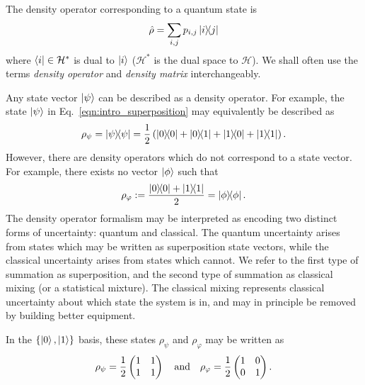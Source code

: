 
The density operator corresponding to a quantum state is
\begin{equation}
\hat{\rho} = \sum_{i, j} p_{i, j} \dyad{i}{j}
\end{equation}
where $\bra{i} \in \mathcal{H}^*$ is dual to $\ket{i}$ ($\mathcal{H}^*$ is the dual space to $\mathcal{H}$). %
We shall often use the terms \emph{density operator} and \emph{density matrix} interchangeably.

Any state vector $\ket{\psi}$ can be described as a density operator. For example, the state $\ket{\psi}$ in Eq.~\ref{eqn:intro_superposition} may equivalently be described as 
\begin{equation}
\rho_\psi = \dyad{\psi}{\psi} = \frac{1}{2} \left(\dyad{0}{0} + \dyad{0}{1} + \dyad{1}{0} + \dyad{1}{1} \right).
\end{equation}
However, there are density operators which do not correspond to a state vector. For example, there exists no vector $\ket{\phi}$ such that
\begin{equation}\label{eqn:intro_mixture}
\rho_{\varphi} := \frac{\dyad{0}{0} + \dyad{1}{1}}{2} = \dyad{\phi}.
\end{equation}
The density operator formalism may be interpreted as encoding two distinct forms of uncertainty: quantum and classical. The quantum uncertainty arises from states which may be written as superposition state vectors, while the classical uncertainty arises from states which cannot. We refer to the first type of summation as superposition, and the second type of summation as classical mixing (or a statistical mixture). The classical mixing represents classical uncertainty about which state the system is in, and may in principle be removed by building better equipment.

In the $\left\{\ket{0}, \ket{1}\right\}$ basis, these states $\rho_\psi$ and $\rho_\varphi$ may be written as
\begin{equation}
\rho_\psi = \frac{1}{2}\pmqty{1 & 1 \\ 1 & 1} \qq{and} \rho_\varphi = \frac{1}{2}\pmqty{1 & 0 \\ 0  & 1}.
\end{equation}


